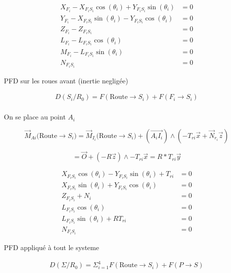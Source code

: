 \documentclass[a4paper,12pt]{report}  %
\begin{document}
\begin{align}
	X_{F_i} - X_{F_iS_i} \cos(\theta_i) + Y_{F_iS_i} \sin(\theta_i) &= 0 \tag{7} \\
	Y_{F_i} - X_{F_iS_i} \sin(\theta_i) - Y_{F_iS_i} \cos(\theta_i) &= 0 \tag{8} \\
	Z_{F_i} - Z_{F_iS_i} &= 0 \tag{9} \\
	L_{F_i} - L_{F_iS_i} \cos(\theta_i) &= 0 \tag{10} \\
	M_{F_i} - L_{F_iS_i} \sin(\theta_i) &= 0 \tag{11} \\
	N_{F_iS_i} &= 0 \tag{12}
\end{align}




PFD sur les roues avant (inertie negligée)



\begin{align}
	D(S_i/R_0) = {F}(\text{Route} \rightarrow S_i) + {F}(F_i \rightarrow S_i) \\
\end{align}



On se place au point $A_i$



$$
\vec{M}_{Ai}({\text{Route} \rightarrow S_i)} = \vec{M}_{I_i}({\text{Route}\rightarrow S_i)} + \left( \overrightarrow{A_iI_i} \right) \wedge (-{T}_{ri}\vec{x} + \vec{N}_{r_i} \vec{z})
$$

$$ 
= \vec{O} + ({-R}\vec{z})\wedge-T_{ri}\vec{x} = R *T_{ri}\vec{y}
$$




\begin{align}
	X_{F_iS_i} \cos(\theta_i) - Y_{F_iS_i} \sin(\theta_i) + T_{ri} &= 0 \tag{13} \\
	X_{F_iS_i}\sin(\theta_i) + Y_{F_iS_i} \cos(\theta_i)&= 0 \tag{14} \\
	Z_{F_iS_i} + N_i &= 0 \tag{15} \\
	L_{F_iS_i} \cos(\theta_i) &= 0 \tag{16} \\
	L_{F_iS_i} \sin(\theta_i) + R T_{ri} &= 0 \tag{17} \\
	N_{F_iS_i} &= 0 \tag{18}
\end{align}




PFD appliqué à tout le systeme



\begin{align}
	D(\Sigma/R_0) = \Sigma_{i=1}^{4}{F}(\text{Route} \rightarrow S_i) + {F}(P \rightarrow S) \\
\end{align}
\end{document}
